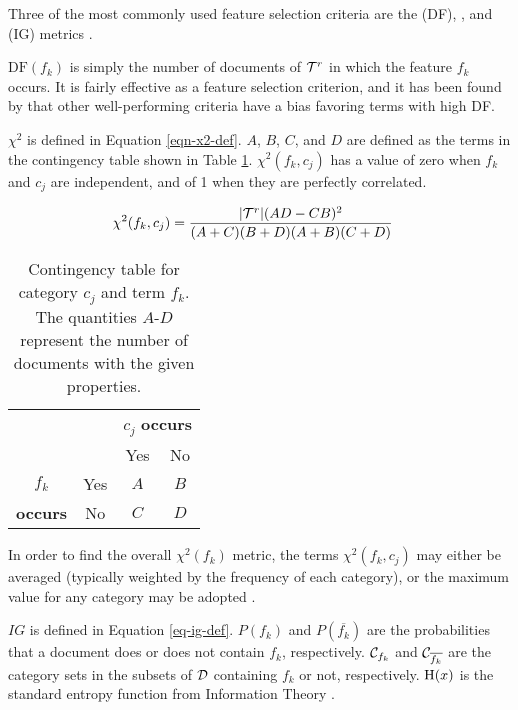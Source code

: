 Three of the most commonly used feature selection criteria are the
 (DF), , and  (IG) metrics \cite{yang:97}.

$\text{DF}(f_k)$ is simply the number of documents of $\mathcal{T}^r$ in
which the feature $f_k$ occurs.  It is fairly effective as a feature
selection criterion, and it has been found by \cite{yang:97} that
other well-performing criteria have a bias favoring terms with high
DF.

$\chi^2$ is defined in Equation \ref{eqn-x2-def}. $A$, $B$, $C$, and
$D$ are defined as the terms in the contingency table shown in Table
\ref{termcat-contingency}.  $\chi^2(f_k,c_j)$ has a value of zero when
$f_k$ and $c_j$ are independent, and of 1 when they are perfectly
correlated.

\begin{align} \label{eqn-x2-def}
\chi^2(f_k,c_j) & = \frac{|\mathcal{T}^r|(AD-CB)^2}{(A+C)(B+D)(A+B)(C+D)}
\end{align}


\begin{table}
\begin{center}
\begin{tabular}{|c|c|c|c|}
\cline{3-4}
\multicolumn{2}{c|}{} & \multicolumn{2}{c|}{$c_j$ \textbf{occurs}} \\
\cline{3-4}
\multicolumn{2}{c|}{} & Yes & No \\
\hline
$f_k$           & Yes & $A$ & $B$ \\
\cline{2-4}
\textbf{occurs} & No  & $C$ & $D$ \\
\hline
\end{tabular}
\end{center}
\caption[Contingency table for category $c_j$ and term $f_k$]
 {Contingency table for category $c_j$ and term $f_k$.  The
  quantities $A$-$D$ represent the number of documents with the given
  properties.}
\label{termcat-contingency}
\end{table}

In order to find the overall $\chi^2(f_k)$ metric, the terms
$\chi^2(f_k,c_j)$ may either be averaged (typically weighted by the
frequency of each category), or the maximum value for any category may
be adopted \cite{yang:97}.

$IG$ is defined in Equation \ref{eq-ig-def}.  $P(f_k)$ and $P(\overline{f_k})$ are
the probabilities that a document does or does not contain $f_k$,
respectively.  $\mathcal{C}_{f_k}$ and $\mathcal{C}_{\overline{f_k}}$ are the
category sets in the subsets of $\mathcal{D}$ containing $f_k$ or not,
respectively.  $\operatorname{H}(x)$ is the standard entropy function from
Information Theory \cite[ch. 2]{manning:99}.

